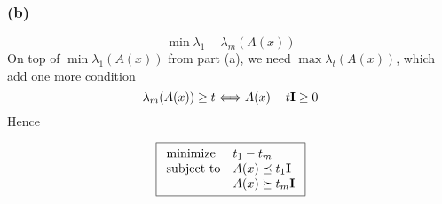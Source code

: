 \documentclass{article}
\begin{document}
    \subsubsection*{(b)}
       \[\min \lambda_1 - \lambda_m(A(x))\]
       On top of $\min \lambda_1(A(x))$ from part (a), we need $\max \lambda_t(A(x))$, which add one more condition
                   \[\lambda_m(A(x)) \ge t \Longleftrightarrow A(x) - t{\bf I} \ge 0\]
Hence

                                \[  \boxed{  \begin{array}{ll}
    \mbox{minimize}   & t_1 -  t_m\\
    \mbox{subject to} & A(x)  \preceq  t_1{\bf I} \\
       & A(x)  \succeq  t_m{\bf I} \\

        \end{array}}
  \]    


       
\end{document}
